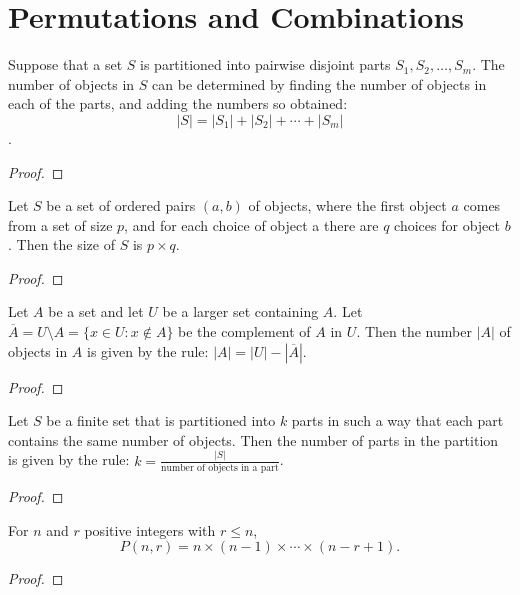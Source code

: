 \chapter{Permutations and Combinations}

\begin{theorem}
  \label{thm:2.1.1}
  \leanok
  Suppose that a set $S$ is partitioned into pairwise disjoint parts $S_1,S_2,
  \ldots, S_m$. The number of objects in $S$ can be determined by finding the number of objects in each
  of the parts, and adding the numbers so obtained:  $$ |S| = |S_1| + |S_2| + \cdots + |S_m| $$.
\end{theorem}
\begin{proof}
  \leanok
\end{proof}

\begin{theorem}
  \label{thm:2.1.2}
  \leanok
  Let $S$ be a set of ordered pairs $(a, b)$ of objects, where the first object $a$ comes from a set of 
  size $p$, and for each choice of object a there are $q$ choices for object $b$. Then
  the size of $S$ is $p \times q$.
\end{theorem}
\begin{proof}
  \leanok
\end{proof}

\begin{theorem}
  \label{thm:2.1.3}
  \leanok
  Let $A$ be a set and let $U$ be a larger set containing $A$. Let $\overline{A} = U
  \setminus A = \{ x \in U : x \notin A \}$ be the complement of $A$ in $U$. Then the number $|A|$ of
  objects in $A$ is given by the rule: $|A| = |U| - |\overline{A}|$.
\end{theorem}
\begin{proof}
  \leanok
\end{proof}

\begin{theorem}
  \label{thm:2.1.4}
  \leanok
  Let $S$ be a finite set that is partitioned into $k$ parts in such a way that each
  part contains the same number of objects. Then the number of parts in the partition is given by the
  rule: $k = \frac{|S|}{\text{number of objects in a part}}$.
\end{theorem}
\begin{proof}
  \leanok
\end{proof}

\begin{theorem}
    \label{thm:2.2.1}
    For $n$ and $r$ positive integers with $r\leq n$,
    \[P(n,r) = n\times(n-1)\times\cdots\times(n-r+1).\]  
\end{theorem} 
\begin{proof}
\end{proof}

